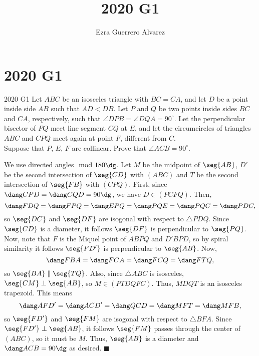 \documentclass[14pt]{article}
\title{2020 G1}
\author{Ezra Guerrero Alvarez}
\begin{document}
\maketitle
	
\section*{2020 G1}

\begin{statement}{2020 G1}
	Let $ABC$ be an isosceles triangle with $BC=CA$, and let $D$ be a point inside side $AB$ such that $AD< DB$. Let $P$ and $Q$ be two points inside sides $BC$ and $CA$, respectively, such that $\angle DPB = \angle DQA = 90^{\circ}$. Let the perpendicular bisector of $PQ$ meet line segment $CQ$ at $E$, and let the circumcircles of triangles $ABC$ and $CPQ$ meet again at point $F$, different from $C$. \\
	Suppose that $P$, $E$, $F$ are collinear. Prove that $\angle ACB = 90^{\circ}$.
\end{statement}
We use directed angles$\mod 180\dg$. Let $M$ be the midpoint of $\seg{AB}$, $D'$ be the second intersection of $\seg{CD}$ with $(ABC)$ and $T$ be the second intersection of $\seg{FB}$ with $(CPQ)$. First, since $\dang CPD=\dang CQD=90\dg$, we have $D\in(PCFQ)$. Then,
\[ \dang FDQ=\dang FPQ=\dang EPQ=\dang PQE=\dang PQC=\dang PDC, \]
so $\seg{DC}$ and $\seg{DF}$ are isogonal with respect to $\triangle PDQ$. Since $\seg{CD}$ is a diameter, it follows $\seg{DF}$ is perpendicular to $\seg{PQ}$. Now, note that $F$ is the Miquel point of $ABPQ$ and $D'BPD$, so by spiral similarity it follows $\seg{FD'}$ is perpendicular to $\seg{AB}$. Now,
\[ \dang FBA=\dang FCA=\dang FCQ=\dang FTQ, \]
so $\seg{BA}\parallel\seg{TQ}$. Also, since $\triangle ABC$ is isosceles, $\seg{CM}\perp\seg{AB}$, so $M\in(PTDQFC)$. Thus, $MDQT$ is an isosceles trapezoid. This means
\[ \dang AFD'=\dang ACD'=\dang QCD=\dang MFT=\dang MFB, \]
so $\seg{FD'}$ and $\seg{FM}$ are isogonal with respect to $\triangle BFA$. Since $\seg{FD'}\perp\seg{AB}$, it follows $\seg{FM}$ passes through the center of $(ABC)$, so it must be $M$. Thus, $\seg{AB}$ is a diameter and $\dang ACB=90\dg$ as desired. $\blacksquare$
	
\end{document}
